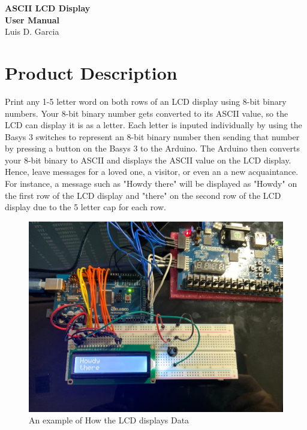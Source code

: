 \documentclass{article}
\begin{document}
\noindent
   \begin{titlepage}
    \vspace*{\fill}
    \begin{center}
      {\huge \textbf{ASCII LCD Display} }\\[0.5cm]
       {\LARGE \textbf{User Manual}}\\[0.4cm]
     {\Large Luis D. Garcia}\\[0.4cm]
    \end{center}
     \vspace*{\fill}
   \end{titlepage}
\newpage

\tableofcontents
\thispagestyle{empty}
\cleardoublepage

\setcounter{page}{1}

\section{Product Description}
\noindent
Print any 1-5 letter word on both rows of an LCD display using 8-bit binary numbers. Your 8-bit 
binary number gets converted to its ASCII value, so the LCD can display it is as a letter.
Each letter is inputed individually by using the Basys 3 switches to represent an 
8-bit binary number then sending that number by pressing a button on the Basys 3 to 
the Arduino. The Arduino then converts your 8-bit binary to ASCII and displays the ASCII 
value on the LCD display. Hence, leave messages for a loved one, a visitor, or even an a new acquaintance. 
For instance, a message such as "Howdy there" will be displayed as "Howdy" on the first row of the LCD display and "there"
on the second row of the LCD display due to the 5 letter cap for each row. 

\begin{figure} [ht!]
\centering
\includegraphics[width=0.6\linewidth]{Howdy.jpeg}
  \caption{An example of How the LCD displays Data}
  \label{fig:fig1}
\end{figure}
\end{document}
